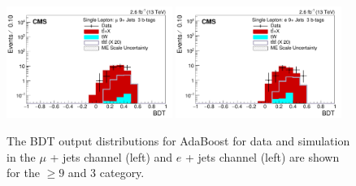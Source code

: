 \begin{figure}[ht!]
    \includegraphics[width=0.48\textwidth]{images/Run2/BDT_Mu29Aug400trees_5MinNodeSize_20nCuts_3MaxDepth_5adaboostbeta_adaBoost_alphaSTune_noMinEvents9nJets3nMtags_StackLogY.pdf}
    \includegraphics[width=0.48\textwidth]{images/Run2/BDT_El29Aug400trees_5MinNodeSize_20nCuts_3MaxDepth_5adaboostbeta_adaBoost_alphaSTune_noMinEvents9nJets3nMtags_StackLogY.pdf}
    \caption{The BDT output distributions for AdaBoost for data and simulation in the $\mu$ + jets channel (left) and $e$ + jets channel (left) are shown for the $\geq9$ \njets  and 3 \nMtags category.}
    \label{fig:BDT_Mu29Aug400trees_5MinNodeSize_20nCuts_3MaxDepth_5adaboostbeta_adaBoost_alphaSTune_noMinEvents93}
\end{figure}

